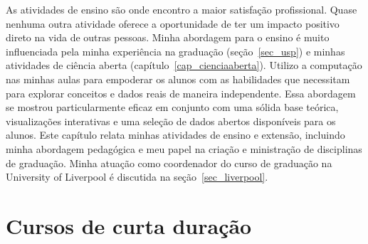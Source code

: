 \documentclass[10pt,a4paper,oneside]{book}
\begin{document}
As atividades de ensino são onde encontro a maior satisfação profissional.
Quase nenhuma outra atividade oferece a oportunidade de ter um impacto positivo
direto na vida de outras pessoas.
Minha abordagem para o ensino é muito influenciada pela minha experiência na
graduação (seção~\ref{sec_usp}) e minhas atividades de ciência aberta
(capítulo~\ref{cap_cienciaaberta}).
Utilizo a computação nas minhas aulas para empoderar os alunos com as
habilidades que necessitam para explorar conceitos e dados reais de maneira
independente.
Essa abordagem se mostrou particularmente eficaz em conjunto com uma sólida
base teórica, visualizações interativas e uma seleção de dados abertos
disponíveis para os alunos.
Este capítulo relata minhas atividades de ensino e extensão, incluindo minha
abordagem pedagógica e meu papel na criação e ministração de disciplinas de
graduação.
Minha atuação como coordenador do curso de graduação na University of Liverpool
é discutida na seção~\ref{sec_liverpool}.

\section{Cursos de curta duração}
\label{sec_workshops}
\end{document}
